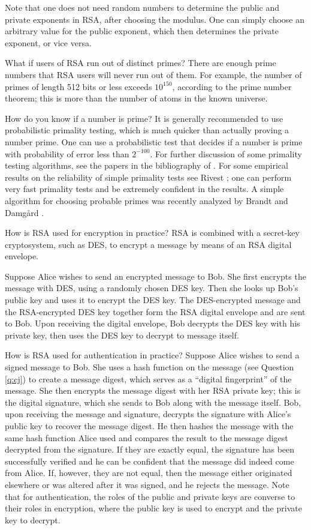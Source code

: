 Note that one does not need random numbers to determine the public and
private exponents in RSA, after choosing the modulus. One can simply
choose an arbitrary value for the public exponent, which then determines
the private exponent, or vice versa.

{What if users of RSA run out of distinct primes?}
There are enough prime numbers that RSA users will never run out of them.
For example, the number of primes of length 512 bits or less exceeds
$10^{150}$, according to the prime number theorem; this is more than the 
number of atoms in the known universe.

{How do you know if a number is prime?}
It is generally recommended to use probabilistic primality testing, which
is much quicker than actually proving a number prime. One can use a 
probabilistic test that decides if a number is prime with probability of 
error less than $2^{-100}$. For further discussion of some primality testing 
algorithms, see the papers in the bibliography of \cite{beauchemin}. 
For some empirical results on the reliability of simple primality tests see 
Rivest \cite {rivest-prob-prime}; one can perform very fast primality tests 
and be extremely confident in the results. A simple algorithm for choosing 
probable primes was recently analyzed by Brandt and Damg{\aa}rd \cite{brandt}.

{How is RSA used for encryption in practice?}
RSA is combined with a secret-key cryptosystem, such as DES, to encrypt
a message by means of an RSA digital envelope. 

Suppose Alice wishes to send an encrypted message to Bob. She first 
encrypts the message with DES, using a randomly chosen DES key. Then 
she looks up Bob's public key and uses it to encrypt the DES key. The 
DES-encrypted message and the RSA-encrypted DES key together form the RSA 
digital envelope and are sent to Bob. Upon receiving the digital envelope, 
Bob decrypts the DES key with his private key, then uses the DES key 
to decrypt to message itself.

{How is RSA used for authentication in practice?}
Suppose Alice wishes to send a signed message to Bob. She uses a hash
function on the message (see Question \ref {q:cj}) to create a message
digest, which serves as a ``digital fingerprint'' of the message. She then 
encrypts the message digest with her RSA private key; this is the digital 
signature, which she sends to Bob along with the message itself. Bob, 
upon receiving the message and signature, decrypts the signature with
Alice's public key to recover the message digest. He then hashes the 
message with the same hash function Alice used and compares the result
to the message digest decrypted from the signature. If they are exactly
equal, the signature has been successfully verified and he can be confident
that the message did indeed come from Alice. If, however, they are not 
equal, then the message either originated elsewhere or was altered after
it was signed, and he rejects the message. Note that for authentication, 
the roles of the public and private keys are converse to their roles in 
encryption, where the public key is used to encrypt and the private key 
to decrypt.

